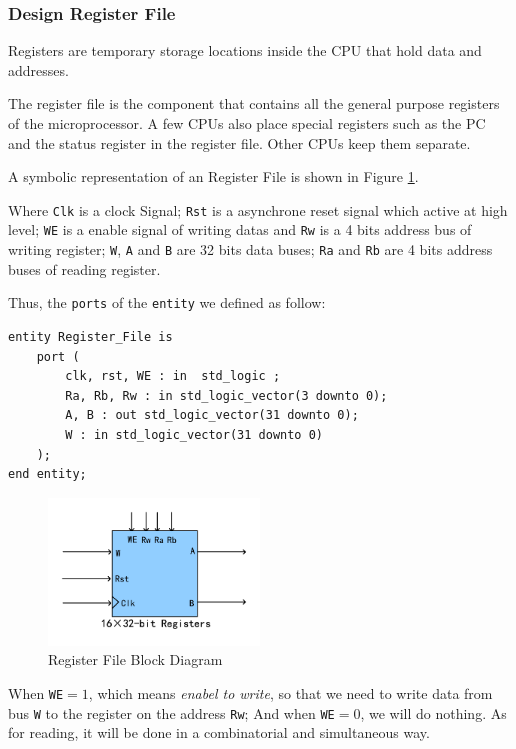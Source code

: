 \subsubsection{Design Register File}

Registers are temporary storage locations inside the CPU 
that hold data and addresses.

The register file is the component that 
contains all the general purpose registers 
of the microprocessor. A few CPUs also place 
special registers such as the PC and the status 
register in the register file. Other CPUs keep 
them separate.\cite{dumas2005computer}

A symbolic representation of an Register File is shown in Figure \ref{fig:RF}.


Where \texttt{Clk} is a clock Signal; \texttt{Rst} is a asynchrone reset signal which active at high level;
\texttt{WE} is a enable signal of writing datas and \texttt{Rw} is a 4 bits address bus of writing register;
\texttt{W}, \texttt{A} and \texttt{B} are 32 bits data buses; \texttt{Ra} and \texttt{Rb} are 4 bits address buses of reading register.

Thus, the \texttt{ports} of the \texttt{entity} we defined as follow:

\begin{lstlisting}[style=vhdl]
entity Register_File is 
	port (
		clk, rst, WE : in  std_logic ; 
		Ra, Rb, Rw : in std_logic_vector(3 downto 0);
		A, B : out std_logic_vector(31 downto 0);
		W : in std_logic_vector(31 downto 0)
	);
end entity;
\end{lstlisting}

\begin{figure}[h]
    \centering
    \includegraphics[width = 0.5\textwidth]{picture/16Register.pdf}
    \caption{Register File Block Diagram}     
    \label{fig:RF}
\end{figure}

When \texttt{WE}$ = 1$, which means \textit{enabel to write}, so that we need to write data from bus \texttt{W} to the register on the address \texttt{Rw};
And when \texttt{WE}$= 0$, we will do nothing.
As for reading, it will be done in a combinatorial and simultaneous way.

